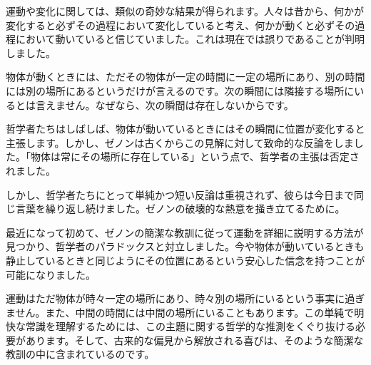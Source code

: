 \documentclass[a4paper,11pt,openany]{ltjsbook}
\begin{document}
運動や変化に関しては、類似の奇妙な結果が得られます。人々は昔から、何かが変化すると必ずその過程において変化していると考え、何かが動くと必ずその過程において動いていると信じていました。これは現在では誤りであることが判明しました。

物体が動くときには、ただその物体が一定の時間に一定の場所にあり、別の時間には別の場所にあるというだけが言えるのです。次の瞬間には隣接する場所にいるとは言えません。なぜなら、次の瞬間は存在しないからです。

哲学者たちはしばしば、物体が動いているときにはその瞬間に位置が変化すると主張します。しかし、ゼノンは古くからこの見解に対して致命的な反論をしました。「物体は常にその場所に存在している」という点で、哲学者の主張は否定されました。

しかし、哲学者たちにとって単純かつ短い反論は重視されず、彼らは今日まで同じ言葉を繰り返し続けました。ゼノンの破壊的な熱意を掻き立てるために。

最近になって初めて、ゼノンの簡潔な教訓に従って運動を詳細に説明する方法が見つかり、哲学者のパラドックスと対立しました。今や物体が動いているときも静止しているときと同じようにその位置にあるという安心した信念を持つことが可能になりました。

運動はただ物体が時々一定の場所にあり、時々別の場所にいるという事実に過ぎません。また、中間の時間には中間の場所にいることもあります。この単純で明快な常識を理解するためには、この主題に関する哲学的な推測をくぐり抜ける必要があります。そして、古来的な偏見から解放される喜びは、そのような簡潔な教訓の中に含まれているのです。
\end{document}
